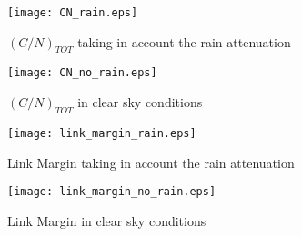 \begin{figure}[ht]
	\begin{minipage}{.5\textwidth}
		\centering
		\texttt{[image: CN\_rain.eps]}
		\caption{$(C/N)_{TOT}$ taking in account the rain attenuation}
		\label{fig:CN_rain}
	\end{minipage}\hspace{0.5cm}
	\begin{minipage}{.5\textwidth}
		\centering
		\texttt{[image: CN\_no\_rain.eps]}
		\caption{$(C/N)_{TOT}$ in clear sky conditions}
		\label{fig:CN_no_rain}
	\end{minipage}
\end{figure}

\begin{figure}[ht]
	\begin{minipage}{.5\textwidth}
		\centering
		\texttt{[image: link\_margin\_rain.eps]}
		\caption{Link Margin taking in account the rain attenuation}
		\label{fig:lm_rain}
	\end{minipage}\hspace{0.5cm}
	\begin{minipage}{.5\textwidth}
		\centering
		\texttt{[image: link\_margin\_no\_rain.eps]}
		\caption{Link Margin in clear sky conditions}
		\label{fig:lm_no_rain}
	\end{minipage}
\end{figure}
